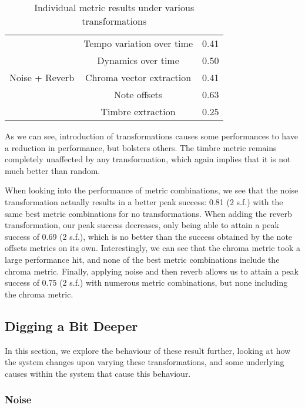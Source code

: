 \documentclass[oneside, class=book, 12pt, crop=false]{standalone}
\begin{document}
\begin{table}[h]
\begin{tabular}{c|cc}
        \multirow{5}{*}{Noise + Reverb} & Tempo variation over time & 0.41 \\ \cline{2-3}
                                &Dynamics over time & 0.50 \\ \cline{2-3}
                                &Chroma vector extraction & 0.41 \\ \cline{2-3}
                                &Note offsets &  0.63\\ \cline{2-3}
                                &Timbre extraction & 0.25 \\ 
        
    \end{tabular}
    \caption{Individual metric results under various transformations}
    \label{table:transformation results}
\end{table}



As we can see, introduction of transformations causes some performances to have a reduction in performance, but bolsters others. The timbre metric remains completely unaffected by any transformation, which again implies that it is not much better than random.

When looking into the performance of metric combinations, we see that the noise transformation actually results in a better peak success: 0.81 (2 s.f.) with the same best metric combinations for no transformations. When adding the reverb transformation, our peak success decreases, only being able to attain a peak success of 0.69 (2 s.f.), which is no better than the success obtained by the note offsets metrics on its own. Interestingly, we can see that the chroma metric took a large performance hit, and none of the best metric combinations include the chroma metric. Finally, applying noise and then reverb allows us to attain a peak success of 0.75 (2 s.f.) with numerous metric combinations, but none including the chroma metric.

\subsection{Digging a Bit Deeper}

In this section, we explore the behaviour of these result further, looking at how the system changes upon varying these transformations, and some underlying causes within the system that cause this behaviour.

\subsubsection{Noise}
\end{document}
